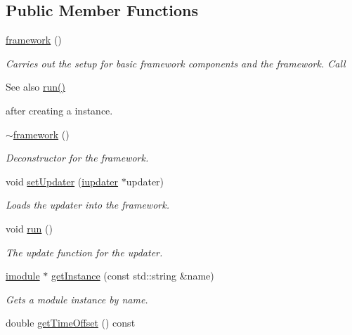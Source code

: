 \subsection*{Public Member Functions}
\begin{DoxyCompactItemize}
\item 
\hyperlink{classflounder_1_1framework_ae7f076f63f78093952477e83174120f9}{framework} ()
\begin{DoxyCompactList}\small\item\em Carries out the setup for basic framework components and the framework. Call \begin{DoxySeeAlso}{See also}
\hyperlink{classflounder_1_1framework_aa3a73c8e8f5f0c6ccef3e4de89982434}{run()}


\end{DoxySeeAlso}
after creating a instance. \end{DoxyCompactList}\item 
\hyperlink{classflounder_1_1framework_a4f5440b66d1c2e7e35d9dc7fd733f944}{$\sim$framework} ()
\begin{DoxyCompactList}\small\item\em Deconstructor for the framework. \end{DoxyCompactList}\item 
void \hyperlink{classflounder_1_1framework_abfa2c0da27ab46791ee7877115afffa3}{set\+Updater} (\hyperlink{classflounder_1_1iupdater}{iupdater} $\ast$updater)
\begin{DoxyCompactList}\small\item\em Loads the updater into the framework. \end{DoxyCompactList}\item 
void \hyperlink{classflounder_1_1framework_aa3a73c8e8f5f0c6ccef3e4de89982434}{run} ()
\begin{DoxyCompactList}\small\item\em The update function for the updater. \end{DoxyCompactList}\item 
\hyperlink{classflounder_1_1imodule}{imodule} $\ast$ \hyperlink{classflounder_1_1framework_a84a2314d26174ab02b48bcda8fd5b4e4}{get\+Instance} (const std\+::string \&name)
\begin{DoxyCompactList}\small\item\em Gets a module instance by name. \end{DoxyCompactList}\item 
double \hyperlink{classflounder_1_1framework_a611e6fcdc2f2f484ebf8bbbdceacd45b}{get\+Time\+Offset} () const

\end{DoxyCompactItemize}
